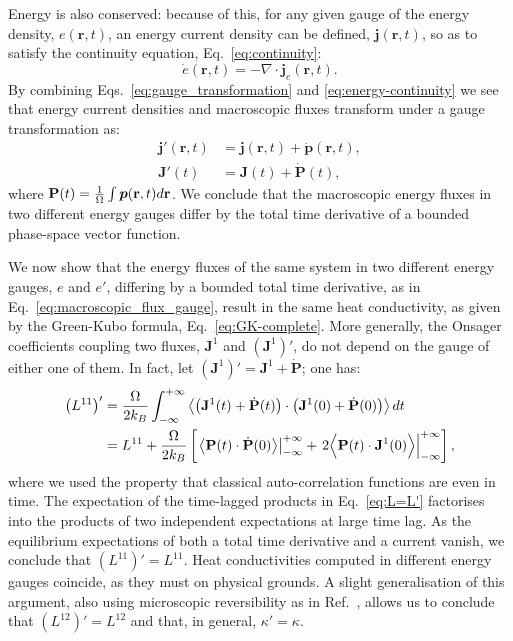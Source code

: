 Energy is also conserved: because of this, for any given gauge of the energy density, $e(\mathbf{r},t)$, an energy current density can be defined, $\bm{j}(\mathbf{r},t)$, so as to satisfy the continuity equation, Eq.~\eqref{eq:continuity}:
\begin{equation}
  \dot{e}(\mathbf{r},t)=-\nabla\cdot
  \mathbf{j}_{e}(\mathbf{r},t). \label{eq:energy-continuity} 
\end{equation}
By combining Eqs.~\eqref{eq:gauge_transformation} and \eqref{eq:energy-continuity} we see that energy current densities and macroscopic fluxes transform under a gauge transformation as:
\begin{align}
 \bm{j}'(\mathbf{r},t) & = \bm{j}(\mathbf{r},t) + \dot{\bm{p}}(\mathbf{r},t), \label{eq:current_density_gauge} \\
  \mathbf{J}'(t) & = \mathbf{J}(t) + \dot{\mathbf{P}}(t), \label{eq:macroscopic_flux_gauge}
\end{align}
where $\mathbf{P}(t)=\frac{1}{{\mathrm\Omega}} \int\bm{p}(\mathbf{r},t)d\mathbf{r}$. We
conclude that the macroscopic energy fluxes in two different energy gauges differ by the total time derivative of a bounded phase-space vector function.

We now show that the energy fluxes of the same system in two different energy gauges, $e$ and $e'$, differing by a bounded total time derivative, as in Eq.~\eqref{eq:macroscopic_flux_gauge}, result in the same heat conductivity, as given by the Green-Kubo formula, Eq.~\eqref{eq:GK-complete}. More generally, the Onsager coefficients coupling two fluxes, $\mathbf{J}^1$ and $\left(\mathbf{J}^1\right)'$, do not depend on the gauge of either one of them. In fact, let $\left(\mathbf{J}^1\right)' = \mathbf{J}^1 + \dot{\mathbf{P}}$; one has:
\begin{equation}
  \begin{aligned}
    \left (L^{11} \right)' &= \frac{\rOmega}{2 k_B }\int_{-\infty}^{+\infty} \left \langle \left (\mathbf{J}^1(t)+\dot{\mathbf{P}}(t) \right ) \cdot  \left (\mathbf{J}^1(0)+\dot{\mathbf{P}}(0)\right ) \right \rangle dt \\
    &= L^{11} + \frac{\rOmega}{2 k_B } \left[ \left .  \left \langle \mathbf{P}(t) \cdot \dot{\mathbf{P}}(0) \right \rangle \right |^{+\infty}_{-\infty} + \left .  2 \Bigl \langle \mathbf{P}(t) \cdot \mathbf{J}^1(0) \Bigr \rangle \right |^{+\infty}_{-\infty} \right] ,
  \end{aligned} \label{eq:L=L'}
\end{equation}
where we used the property that classical auto-correlation functions are even in time.
The expectation of the time-lagged products in Eq.~\eqref{eq:L=L'} factorises into the products of two independent expectations at large time lag. As the equilibrium expectations of both a total time derivative and a current vanish, we conclude that $\left (L^{11}\right )'=L^{11}$. Heat conductivities computed in different energy gauges coincide, as they must on physical grounds. A slight generalisation of this argument, also using microscopic reversibility as in Ref.~\cite{Onsager1931a,Onsager1931b}, allows us to conclude that $\left (L^{12} \right )'=L^{12}$ and that, in general, $\kappa'=\kappa$.

